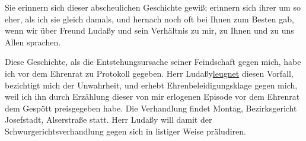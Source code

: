 \pstart
           Sie erinnern sich dieser abscheulichen Geschichte gewiß; erinnern sich ihrer um so
               eher, als ich sie gleich damals, und hernach noch oft bei Ihnen zum Besten gab, wenn
               wir über Freund Ludaßy und sein Verhältnis zu
               mir, zu Ihnen und zu uns Allen sprachen.\pend
           
\pstart
           Diese Geschichte, als die Entstehungsursache seiner Feindschaft gegen mich, habe ich
               vor dem Ehrenrat zu Protokoll gegeben. Herr Ludaßy\uline{leugnet} diesen Vorfall, bezichtigt mich der
               Unwahrheit, und erhebt Ehrenbeleidigungsklage gegen mich, weil ich ihn durch
               Erzählung dieser von mir erlogenen Episode vor dem Ehrenrat dem Gespött preisgegeben
               habe. Die Verhandlung findet Montag, Bezirksgericht Josefstadt, Alserstraße statt. Herr Ludaßy will
               damit der Schwurgerichtsverhandlung gegen sich in listiger Weise präludiren.\pend
           
